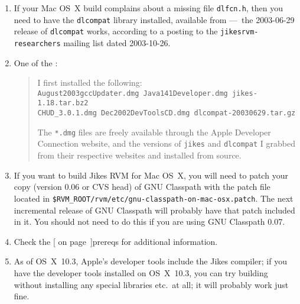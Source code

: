 \begin{enumerate}
\item
If your Mac OS~X build complains about a missing file  \texttt{dlfcn.h}, then 
you need to have the \texttt{dlcompat} library installed, available from 
---~the 2003-06-29 release of \texttt{dlcompat} works, according to a posting to
the \texttt{jikesrvm-researchers} mailing list dated 2003-10-26.

\item
One of the :
\begin{quote}
\raggedright
I first installed the following: \\
\OneCMStrut{}\texttt{August2003gccUpdater.dmg  Java141Developer.dmg jikes-1.18.tar.bz2 \\
\OneCMStrut{}CHUD\_3.0.1.dmg Dec2002DevToolsCD.dmg     dlcompat-20030629.tar.gz \\
}

The \texttt{*.dmg} files are freely available through the Apple
Developer Connection 
website, and the versions of \texttt{jikes} and \texttt{dlcompat} I grabbed from their
respective websites and installed from source.
\end{quote}

\item
If you want to build Jikes RVM for Mac OS~X, you will need to patch
your copy (version 0.06 or CVS head) of GNU Classpath with the patch
file located
in \texttt{\$RVM\_\-ROOT/\-rvm/\-etc/\-gnu-classpath-on-mac-osx.patch}.  The
next incremental release of GNU Classpath will probably have that
patch included in it.  You should not need to do this if you are using
GNU Classpath 0.07.

\item
Check the [ on page~\Pageref]{prereqs} for additional
information. 

\item As of OS~X~10.3, Apple's developer tools include the Jikes
  compiler; if you have the developer tools installed on OS~X~10.3,
  you can try building without installing any special libraries
  etc.\ at all; it will probably work just fine.

\end{enumerate}


